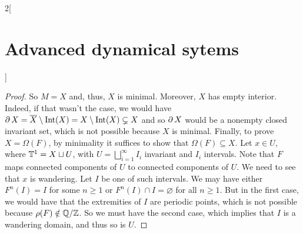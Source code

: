 \documentclass[../../../main_math.tex]{subfiles}
\begin{document}
\begin{multicols}{2}[\section{Advanced dynamical sytems}]
\begin{proof}
    So $M=X$ and, thus, $X$ is minimal. Moreover, $X$ has empty interior. Indeed, if that wasn't the case, we would have $\operatorname{\partial}{X}=\overline{X}\setminus\operatorname{Int}(X)=X\setminus \operatorname{Int}(X)\subsetneq X$ and so $\operatorname{\partial}{X}$ would be a nonempty closed invariant set, which is not possible because $X$ is minimal. Finally, to prove $X=\Omega(F)$, by minimality it suffices to show that $\Omega(F)\subseteq X$. Let $x\in U$, where $\mathbb{T}^1=X\sqcup U$, with $U=\bigsqcup_{i=1}^\infty I_i$ invariant and $I_i$ intervals. Note that $F$ maps connected components of $U$ to connected components of $U$. We need to see that $x$ is wandering. Let $I$ be one of such intervals. We may have either $F^n(I)=I$ for some $n\geq 1$ or $F^n(I)\cap I=\varnothing$ for all $n\geq 1$. But in the first case, we would have that the extremities of $I$ are periodic points, which is not possible because $\rho(F)\notin\quot{\QQ}{\ZZ}$. So we must have the second case, which implies that $I$ is a wandering domain, and thus so is $U$.
  \end{proof}

\end{multicols}
\end{document}
